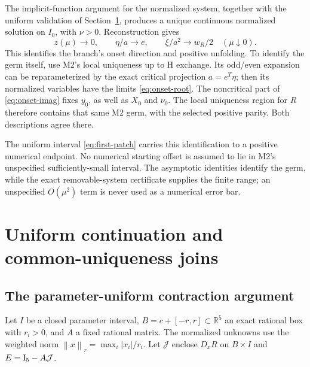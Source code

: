 \documentclass[11pt,a4paper]{article}
\numberwithin{equation}{section}
\newcommand{\R}{\mathbb R}\newcommand{\C}{\mathbb C}
\newcommand{\normr}[1]{\left\|#1\right\|_r}
\begin{document}
The implicit-function argument for the normalized system, together with the uniform validation of Section~\ref{sec:validation}, produces a unique continuous normalized solution on $I_0$, with $\nu>0$. Reconstruction gives
\begin{equation}
z(\mu)\longrightarrow0,\qquad
\eta/a\longrightarrow e,\qquad \xi/a^2\longrightarrow w_R/2
\quad(\mu\downarrow0).\label{eq:germ-limit}
\end{equation}
This identifies the branch's onset direction and positive unfolding. To identify the germ itself, use M2's local uniqueness up to H exchange. Its odd/even expansion can be reparameterized by the exact critical projection $a=e^T\eta$; then its normalized variables have the limits \eqref{eq:onset-root}. The noncritical part of \eqref{eq:onset-imag} fixes $y_0$, as well as $X_0$ and $\nu_0$. The local uniqueness region for $R$ therefore contains that same M2 germ, with the selected positive parity. Both descriptions agree there.

The uniform interval \eqref{eq:first-patch} carries this identification to a positive numerical endpoint. No numerical starting offset is assumed to lie in M2's unspecified sufficiently-small interval. The asymptotic identities identify the germ, while the exact removable-system certificate supplies the finite range; an unspecified $O(\mu^2)$ term is never used as a numerical error bar.

\section{Uniform continuation and common-uniqueness joins}\label{sec:validation}
\subsection{The parameter-uniform contraction argument}\label{sec:lemma}
Let $I$ be a closed parameter interval, $B=c+[-r,r]\subset\R^5$ an exact rational box with $r_i>0$, and $A$ a fixed rational matrix. The normalized unknowns use the weighted norm $\normr{x}=\max_i|x_i|/r_i$. Let $\mathcal J$ enclose $D_xR$ on $B\times I$ and $E=\mathrm I_5-A\mathcal J$.
\end{document}
